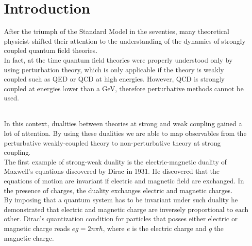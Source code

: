 

\chapter{Introduction}

After the triumph of the Standard Model in the seventies, many theoretical physicist shifted their attention to the understanding of the dynamics of strongly coupled quantum field theories. \\
In fact, at the time quantum field theories were properly understood only by using perturbation theory, which is only applicable if the theory is weakly coupled such as QED or QCD at high energies.
However, QCD is strongly coupled at energies lower than a GeV, therefore perturbative methods cannot be used.
\begin{comment}
Perturbative methods rely on the fact that the theory in question is weakly coupled, i.e. its coupling constant is much lower than one. This was not a problem for QED since its coupling constant $\alpha \sim 1/137$ is much lower than one at low energies and grows slowly while increasing the energy scale.
As a result, QED calculations have a high precision and non-perturbative methods were not needed.\\
In 1973 was discovered that quantum chromodynamics with three flavours is asymptotically free, i.e. its coupling constant becomes smaller at higher energies. 
As a result, collider physics can be understood in terms of Feynman diagrams but at low-energies the theory is strongly coupled and perturbation theory cannot be used to understand the dynamics of the theory.
Computer simulations on a lattice are the most reliable tool to investigate QCD at low-energies, but they cannot provide a complete understanding of the behavior of QCD.\\ 
\end{comment}\
\\
In this context, dualities between theories at strong and weak coupling gained a lot of attention. 
By using these dualities we are able to map observables from the perturbative weakly-coupled theory to non-perturbative theory at strong coupling.
\\

The first example of strong-weak duality is the electric-magnetic duality of Maxwell's equations discovered by Dirac in 1931.  
He discovered that the equations of motion are invariant if electric and magnetic field are exchanged. 
In the presence of charges, the duality exchanges electric and magnetic charges. \\
By imposing that a quantum system has to be invariant under such duality he demonstrated that electric and magnetic charge are inversely proportional to each other. 
Dirac's quantization condition for particles that posses either electric or magnetic charge reads $e g =  2 n \pi \hbar$, where $e$ is the electric charge and $g$ the magnetic charge.
\\

